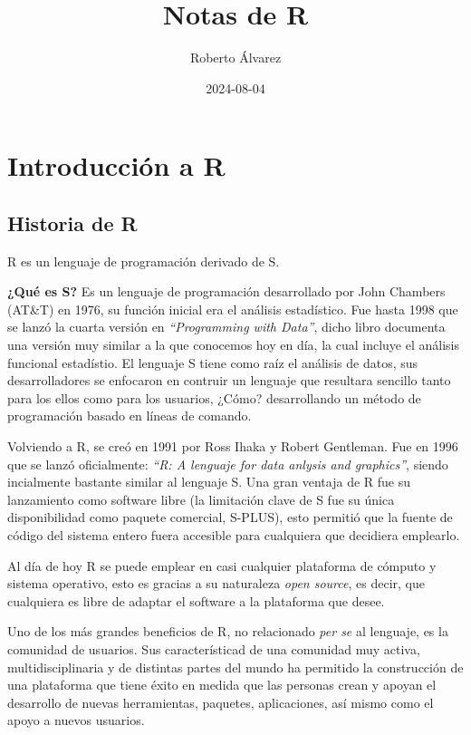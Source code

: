 \documentclass[
]{book}
\title{Notas de R}
\author{Roberto Álvarez}
\date{2024-08-04}
\begin{document}
\maketitle

{
\setcounter{tocdepth}{1}
\tableofcontents
}
\chapter{Introducción a R}\label{intro}

\section{Historia de R}\label{historia-de-r}

R es un lenguaje de programación derivado de S.

\textbf{¿Qué es S?} Es un lenguaje de programación desarrollado por John Chambers (AT\&T) en 1976, su función inicial era el análisis estadístico. Fue hasta 1998 que se lanzó la cuarta versión en \emph{``Programming with Data''}, dicho libro documenta una versión muy similar a la que conocemos hoy en día, la cual incluye el análisis funcional estadístio. El lenguaje S tiene como raíz el análisis de datos, sus desarrolladores se enfocaron en contruir un lenguaje que resultara sencillo tanto para los ellos como para los usuarios, ¿Cómo? desarrollando un método de programación basado en líneas de comando.

Volviendo a R, se creó en 1991 por Ross Ihaka y Robert Gentleman. Fue en 1996 que se lanzó oficialmente: \emph{``R: A lenguaje for data anlysis and graphics''}, siendo incialmente bastante similar al lenguaje S. Una gran ventaja de R fue su lanzamiento como software libre (la limitación clave de S fue su única disponibilidad como paquete comercial, S-PLUS), esto permitió que la fuente de código del sistema entero fuera accesible para cualquiera que decidiera emplearlo.

Al día de hoy R se puede emplear en casi cualquier plataforma de cómputo y sistema operativo, esto es gracias a su naturaleza \emph{open source}, es decir, que cualquiera es libre de adaptar el software a la plataforma que desee.

Uno de los más grandes beneficios de R, no relacionado \emph{per se} al lenguaje, es la comunidad de usuarios. Sus característicad de una comunidad muy activa, multidisciplinaria y de distintas partes del mundo ha permitido la construcción de una plataforma que tiene éxito en medida que las personas crean y apoyan el desarrollo de nuevas herramientas, paquetes, aplicaciones, así mismo como el apoyo a nuevos usuarios.
\end{document}

